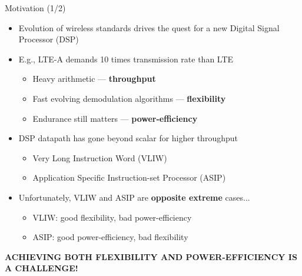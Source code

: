 \documentclass[handout]{beamer}
\begin{document}
\begin{CJK}{UTF8}{bkai}
    \begin{frame}{Motivation (1/2)}
        \begin{itemize}
            \pause
            \item {
                    Evolution of wireless standards drives the quest for a new Digital Signal Processor (DSP)
                }
            \pause
            \item {
                    E.g., LTE-A demands 10 times transmission rate than LTE
                    \begin{itemize}
                        \pause
                        \item {
                                Heavy arithmetic --- \textbf{throughput}
                            }
                        \pause
                        \item {
                                Fast evolving demodulation algorithms --- \textbf{flexibility}
                            }
                        \pause
                        \item {
                                Endurance still matters --- \textbf{power-efficiency}
                            }
                    \end{itemize}
                }
            \pause
            \item { 
                    DSP datapath has gone beyond scalar for higher throughput
                    \begin{itemize}
                        \pause
                        \item Very Long Instruction Word (VLIW)
                        \pause
                        \item Application Specific Instruction-set Processor (ASIP)
                    \end{itemize}
                }
            \pause
            \item {
                    Unfortunately, VLIW and ASIP are \textbf{opposite extreme} cases...
                    \begin{itemize}
                        \item VLIW: good flexibility, bad power-efficiency
                        \item ASIP: good power-efficiency, bad flexibility
                    \end{itemize}
                }
        \end{itemize}
        \pause
        \begin{center}
        \large{\textbf{ACHIEVING BOTH FLEXIBILITY AND POWER-EFFICIENCY IS A CHALLENGE!}}
        \end{center}
    \end{frame}


\end{CJK}
\end{document}
